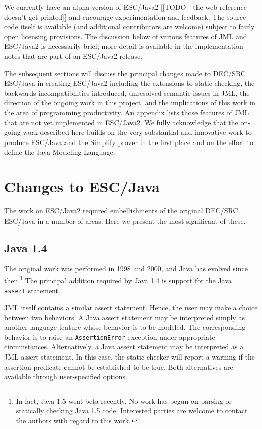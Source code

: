 \documentclass{sig-alternate}
\begin{document}
We currently have an alpha version of ESC/Java2
[[TODO - the web reference doesn't get printed]]
 and encourage experimentation and feedback.  The source
code itself is available (and additional contributors are welcome)
subject to fairly open licensing provisions.  The discussion below of various
features of JML and ESC/Java2 is necessarily brief; more detail is
available in the implementation notes that are part of an ESC/Java2 release.

The subsequent sections will discuss the principal changes made to DEC/SRC ESC/Java in creating ESC/Java2 including the extensions to static checking, the backwards incompatibilities introduced, unresolved semantic issues in JML, the direction of the ongoing work in this project, and the implications of this 
work in the area of programming productivity.  An appendix lists 
those features of JML that are not yet implemented in ESC/Java2.
We fully acknowledge
that the on-going work described here builds on the very substantial
and innovative work to produce ESC/Java and the Simplify prover in the
first place and on the effort to define the Java Modeling Language.


\section{Changes to ESC/Java}

The work on ESC/Java2 required embellishments of the original DEC/SRC
ESC/Java in a number of areas.  Here we present the most significant
of these.
\subsection{Java 1.4}
The original work was performed in 1998 and 2000, and Java has evolved
since then.\footnote{In fact, Java 1.5 went beta recently.  No work has begun on
  parsing or statically checking Java 1.5 code.  Interested parties
  are welcome to contact the authors with regard to this work.}  The
principal addition required by Java 1.4 is support for the Java {\tt
  assert} statement.  

JML itself contains a similar assert statement.  Hence, the user may make a choice between
two behaviors.  A Java assert statement may be interpreted simply as another language
feature whose behavior is to be modeled.  The corresponding behavior is to raise an
 \texttt{AssertionError} exception under appropriate circumstances.  Alternatively, 
a Java assert statement may be interpreted as a JML assert statement.  In this case, the
static checker will report a warning if the assertion predicate cannot be established to be true.
Both alternatives are available through user-specified options.
\end{document}

